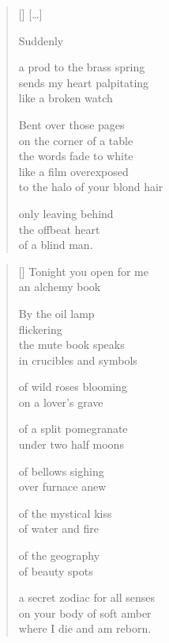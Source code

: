 \documentclass[14pt]{extbook}
\newcommand*{\centeredornament}{\centerline{\pgfornament[width=6cm]{88}}}
\begin{document}
\newpage

\vspace*{-15mm}
\centeredornament
\vspace*{-7mm}

\poemtitle*{\phantom{IX}}

\settowidth{\versewidth}{to the halo of your blond hair}

\begin{verse}[\versewidth]
  \textnormal{[\ldots]}

  Suddenly

  a prod to the brass spring \\
  sends my heart palpitating \\
  like a broken watch

  Bent over those pages \\
  on the corner of a table \\
  the words fade to white \\
  like a film overexposed \\
  to the halo of your blond hair

  only leaving behind \\
  the offbeat heart \\
  of a blind man.
\end{verse}


\newpage

\vspace*{-15mm}
\centeredornament
\vspace*{-7mm}


\settowidth{\versewidth}{a secret zodiac for all senses}

\begin{verse}[\versewidth]
  Tonight you open for me \\
  an alchemy book

  By the oil lamp \\
  flickering \\
  the mute book speaks \\
  in crucibles and symbols

  of wild roses blooming \\
  on a lover's grave

  of a split pomegranate \\
  under two half moons

  of bellows sighing \\
  over furnace anew

  of the mystical kiss \\
  of water and fire

  of the geography \\
  of beauty spots

  a secret zodiac for all senses \\
  on your body of soft amber \\
  where I die and am reborn.
\end{verse}
\end{document}
